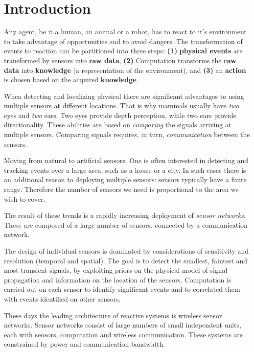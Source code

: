 \section{Introduction}
Any agent, be it a human, an animal or a robot, has to react to it's
environment to take advantage of opportunities and to avoid
dangers. The transformation of events to reaction can be partitioned
into three steps: {\bf(1)} {\bf physical events} are transformed by
sensors into {\bf raw data}, {\bf (2)} Computation transforms the {\bf
  raw data} into {\bf knowledge} (a representation of the
environment), and {\bf (3)} an {\bf action} is chosen based on the
acquired {\bf knowledge}.


When detecting and localizing physical there are significant
advantages to using multiple sensors at different
locations. That is why mammals usually have {\em two} eyes and {\em two}
ears. Two eyes provide depth perception, while two ears
provide directionality. These
abilities are based on {\em comparing} the signals arriving at multiple sensors. 
Comparing signals requires, in turn, {\em
  communication} between the sensors.

Moving from natural to artificial sensors. One is often interested in
detecting and tracking events over a large area, such as a house or a
city. In such cases there is an additional reason to deploying
multiple sensors: sensors typically have a finite range. Therefore the
number of sensors we need is proportional to the area we wish to
cover.

The result of these trends is a rapidly increasing deployment of
{\em  sensor networks}. These are composed
of a large number of sensors, connected by a communication network.

The design of individual sensors is dominated by considerations of
sensitivity and resolution (temporal and spatial).  The goal is to
detect the smallest, faintest and most transient signals, by
exploiting priors on the physical model of signal propagation and
information on the location of the sensors. Computation is carried out
on each sensor to identify significant events and to correlated them
with events identified on other sensors.

These days the leading architecture of reactive systems is wireless
sensor networks. Sensor networks consist of large numbers of small
independent units, each with sensors, computation and wireless
communication. These systems are constrained by power and communication
bandwidth.


